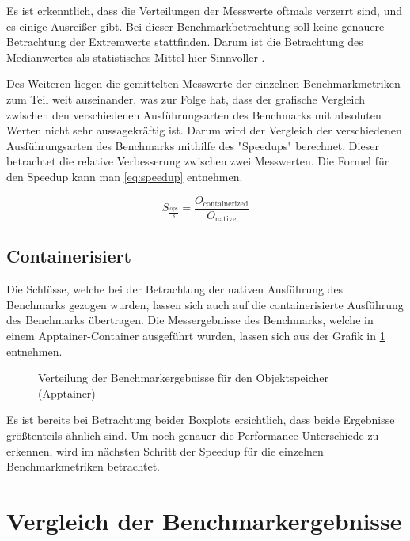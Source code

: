 Es ist erkenntlich, dass die Verteilungen der Messwerte oftmals verzerrt sind, und es einige Ausreißer gibt. Bei dieser Benchmarkbetrachtung soll keine genauere Betrachtung der Extremwerte stattfinden. Darum ist die Betrachtung des Medianwertes als statistisches Mittel hier Sinnvoller \cite[Vgl. S. 15f]{stengelStatistikUndAufbereitung2011}. 

Des Weiteren liegen die gemittelten Messwerte der einzelnen Benchmarkmetriken zum Teil weit auseinander, was zur Folge hat, dass der grafische Vergleich zwischen den verschiedenen Ausführungsarten des Benchmarks mit absoluten Werten nicht sehr aussagekräftig ist. Darum wird der Vergleich der verschiedenen Ausführungsarten des Benchmarks mithilfe des "Speedups" berechnet. Dieser betrachtet die relative Verbesserung zwischen zwei Messwerten. Die Formel für den Speedup kann man \cref{eq:speedup} entnehmen.


\begin{equation} \label{eq:speedup}
S_{\frac{\text{ops}}{\text{s}}} = \frac{O_{\text{containerized}}}{O_{\text{native}}}
\end{equation}


\subsection{Containerisiert}

Die Schlüsse, welche bei der Betrachtung der nativen Ausführung des Benchmarks gezogen wurden, lassen sich auch auf die containerisierte Ausführung des Benchmarks übertragen. Die Messergebnisse des Benchmarks, welche in einem Apptainer-Container ausgeführt wurden, lassen sich aus der Grafik in \cref{fig:boxplot_object_apptainer} entnehmen.


\begin{figure}[H]
    
    \caption{Verteilung der Benchmarkergebnisse für den Objektspeicher (Apptainer)}
    \label{fig:boxplot_object_apptainer}
\end{figure}


Es ist bereits bei Betrachtung beider Boxplots ersichtlich, dass beide Ergebnisse größtenteils ähnlich sind. Um noch genauer die Performance-Unterschiede zu erkennen, wird im nächsten Schritt der Speedup für die einzelnen Benchmarkmetriken betrachtet.


\pagebreak

\section{Vergleich der Benchmarkergebnisse}

